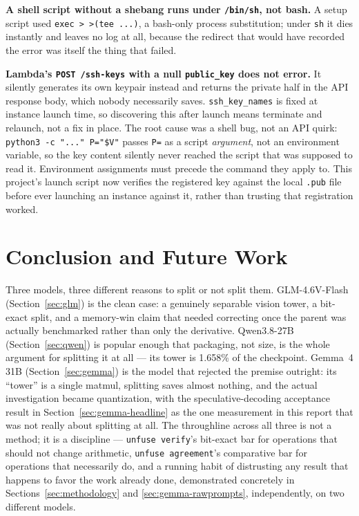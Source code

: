 \documentclass[11pt]{article}
\begin{document}
\textbf{A shell script without a shebang runs under \texttt{/bin/sh}, not bash.} A
setup script used \texttt{exec > >(tee ...)}, a bash-only process substitution; under
\texttt{sh} it dies instantly and leaves no log at all, because the redirect that would
have recorded the error was itself the thing that failed.

\textbf{Lambda's \texttt{POST /ssh-keys} with a null \texttt{public\_key} does not
error.} It silently generates its own keypair instead and returns the private half in
the API response body, which nobody necessarily saves. \texttt{ssh\_key\_names} is fixed
at instance launch time, so discovering this after launch means terminate and relaunch,
not a fix in place. The root cause was a shell bug, not an API quirk:
\texttt{python3 -c "..." P="\$V"} passes \texttt{P=} as a script \emph{argument}, not an
environment variable, so the key content silently never reached the script that was
supposed to read it. Environment assignments must precede the command they apply to.
This project's launch script now verifies the registered key against the local
\texttt{.pub} file before ever launching an instance against it, rather than trusting
that registration worked.

\section{Conclusion and Future Work}
\label{sec:conclusion}

Three models, three different reasons to split or not split them. GLM-4.6V-Flash
(Section~\ref{sec:glm}) is the clean case: a genuinely separable vision tower, a
bit-exact split, and a memory-win claim that needed correcting once the parent was
actually benchmarked rather than only the derivative. Qwen3.8-27B
(Section~\ref{sec:qwen}) is popular enough that packaging, not size, is the whole
argument for splitting it at all --- its tower is 1.658\% of the checkpoint. Gemma~4 31B
(Section~\ref{sec:gemma}) is the model that rejected the premise outright: its
``tower'' is a single matmul, splitting saves almost nothing, and the actual
investigation became quantization, with the speculative-decoding acceptance result in
Section~\ref{sec:gemma-headline} as the one measurement in this report that was not
really about splitting at all. The throughline across all three is not a method; it is
a discipline --- \texttt{unfuse verify}'s bit-exact bar for operations that should not
change arithmetic, \texttt{unfuse agreement}'s comparative bar for operations that
necessarily do, and a running habit of distrusting any result that happens to favor the
work already done, demonstrated concretely in Sections~\ref{sec:methodology} and
\ref{sec:gemma-rawprompts}, independently, on two different models.
\end{document}
